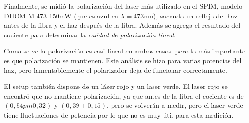             
        Finalmente, se midió la polarización del laser más utilizado en el SPIM, modelo DHOM-M-473-150mW (que es azul en $\lambda = 473$nm), sacando un reflejo del haz antes de la fibra y el haz después de la fibra. Además se agrega el resultado del cociente para determinar la \emph{calidad de polarización lineal}. 
        
        Como se ve la polarización es casi lineal en ambos casos, pero lo más importante es que polarización se mantienen. Este análisis se hizo para varias potencias del haz, pero lamentablemente el polarizador deja de funcionar correctamente. 
        
        El setup también dispone de un láser rojo y un laser verde. El laser rojo se encontró que no mantiene polarización, ya que antes de la fibra el cociente es de $(0,94pm0,32)$ y $(0,39\pm 0,15)$, pero se volverán a medir, pero el laser verde tiene fluctuaciones de potencia por lo que no es muy útil para esta medición.
        
